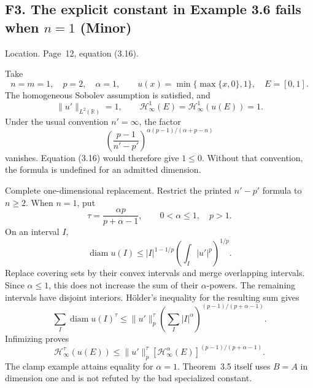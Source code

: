\documentclass[10pt]{article}
\begin{document}
\subsection*{F3. The explicit constant in Example 3.6 fails when \(n=1\) (Minor)}
Location. Page 12, equation (3.16).\par
Take \[n=m=1,\quad p=2,\quad\alpha=1,\qquad
 u(x)=\min\{\max\{x,0\},1\},\quad E=[0,1].\] The homogeneous Sobolev assumption is satisfied, and \[\|u'\|_{L^2(\mathbb R)}=1,\qquad
 \mathcal H_\infty^1(E)=\mathcal H_\infty^1(u(E))=1.\] Under the usual convention \(n'=\infty\), the factor \[\left(\frac{p-1}{n'-p'}\right)^{
       \alpha(p-1)/(\alpha+p-n)}\] vanishes. Equation (3.16) would therefore give \(1\le0\). Without that convention, the formula is undefined for an admitted dimension.\par
Complete one-dimensional replacement. Restrict the printed \(n'-p'\) formula to \(n\ge2\). When \(n=1\), put \[\tau=\frac{\alpha p}{p+\alpha-1},\qquad 0<\alpha\le1,\quad p>1.\] On an interval \(I\), \[\operatorname{diam}u(I)\le |I|^{1-1/p}
 \left(\int_I|u'|^p\right)^{1/p}.\] Replace covering sets by their convex intervals and merge overlapping intervals. Since \(\alpha\le1\), this does not increase the sum of their \(\alpha\)-powers. The remaining intervals have disjoint interiors. Hölder’s inequality for the resulting sum gives \[\sum_I\operatorname{diam}u(I)^\tau
 \le \|u'\|_p^\tau
       \left(\sum_I |I|^\alpha\right)^{(p-1)/(p+\alpha-1)}.\] Infimizing proves \[\mathcal H_\infty^\tau(u(E))
 \le \|u'\|_p^\tau
       [\mathcal H_\infty^\alpha(E)]^{(p-1)/(p+\alpha-1)}.\] The clamp example attains equality for \(\alpha=1\). Theorem 3.5 itself uses \(B=A\) in dimension one and is not refuted by the bad specialized constant.\par
\end{document}
